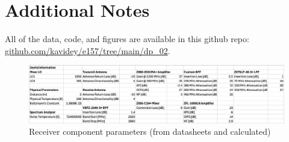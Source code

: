 \documentclass[letterpaper,12pt]{article}
\begin{document}

\newpage
\section{Additional Notes} \label{sec:additional}
All of the data, code, and figures are available in this github repo: \url{github.com/kavidey/e157/tree/main/dp_02}. 

\begin{figure}[H]
	\begin{centering}
		\includegraphics[width=1\columnwidth]{figures/params}
		\caption{Receiver component parameters (from datasheets and calculated)}
	\end{centering}
\end{figure}




\end{document}

